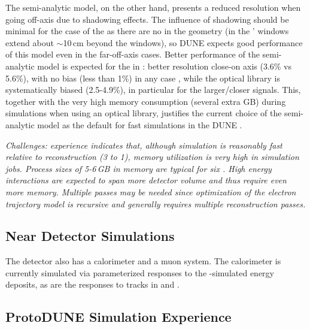 \documentclass[../main-v1.tex]{subfiles}
\begin{document}
The semi-analytic model, on the other hand, presents a reduced resolution when going off-axis due to shadowing effects. The influence of shadowing should be minimal for the case of %
the  as there are no  in the geometry (in  the ' windows %
extend about $\sim$10\,cm beyond the  windows), so %
DUNE expects  good performance of this %
model even in the far-off-axis cases.
Better performance of the semi-analytic model is expected for the  in : better resolution close-on axis (3.6\% vs 5.6\%), with no bias (less than 1\%) in any case , while the optical library is systematically biased (2.5-4.9\%), in particular for the larger/closer signals. This, together with the very high memory consumption (several extra GB) during simulations when using an optical library, justifies the current choice of the semi-analytic model as the default for fast simulations in the DUNE .




{\it Challenges:   experience indicates that, although simulation is reasonably fast relative to reconstruction (3 to 1), memory utilization %
is very high in simulation jobs.  Process sizes of 5-6\,GB in memory are typical for six .  High energy  interactions are expected to span more detector volume and thus require even more memory. Multiple  passes may be needed since optimization of the electron trajectory model is recursive and generally requires multiple reconstruction passes. }

\subsection{Near Detector Simulations}
The  detector also has a calorimeter and a muon system.  The calorimeter is currently simulated via parameterized responses to the -simulated energy deposits, as are the responses to tracks in  and .

\subsection{ProtoDUNE Simulation Experience}
\end{document}
